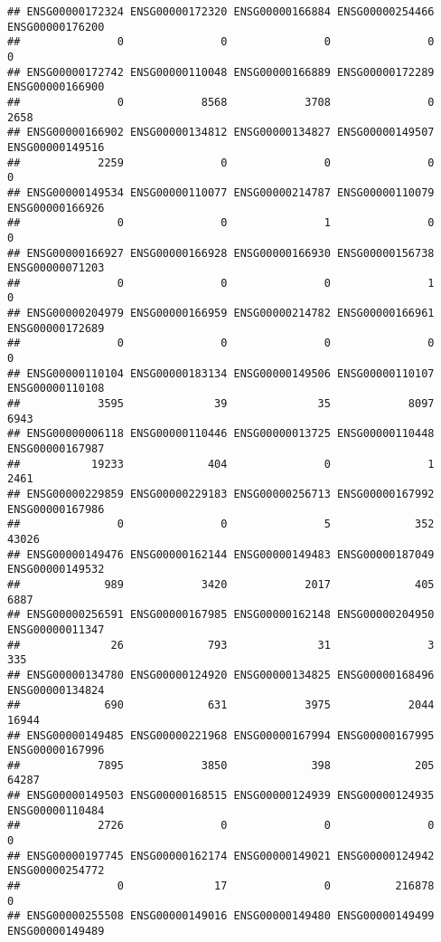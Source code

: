 \documentclass[
]{article}
\begin{document}
\begin{verbatim}
## ENSG00000172324 ENSG00000172320 ENSG00000166884 ENSG00000254466 ENSG00000176200 
##               0               0               0               0               0 
## ENSG00000172742 ENSG00000110048 ENSG00000166889 ENSG00000172289 ENSG00000166900 
##               0            8568            3708               0            2658 
## ENSG00000166902 ENSG00000134812 ENSG00000134827 ENSG00000149507 ENSG00000149516 
##            2259               0               0               0               0 
## ENSG00000149534 ENSG00000110077 ENSG00000214787 ENSG00000110079 ENSG00000166926 
##               0               0               1               0               0 
## ENSG00000166927 ENSG00000166928 ENSG00000166930 ENSG00000156738 ENSG00000071203 
##               0               0               0               1               0 
## ENSG00000204979 ENSG00000166959 ENSG00000214782 ENSG00000166961 ENSG00000172689 
##               0               0               0               0               0 
## ENSG00000110104 ENSG00000183134 ENSG00000149506 ENSG00000110107 ENSG00000110108 
##            3595              39              35            8097            6943 
## ENSG00000006118 ENSG00000110446 ENSG00000013725 ENSG00000110448 ENSG00000167987 
##           19233             404               0               1            2461 
## ENSG00000229859 ENSG00000229183 ENSG00000256713 ENSG00000167992 ENSG00000167986 
##               0               0               5             352           43026 
## ENSG00000149476 ENSG00000162144 ENSG00000149483 ENSG00000187049 ENSG00000149532 
##             989            3420            2017             405            6887 
## ENSG00000256591 ENSG00000167985 ENSG00000162148 ENSG00000204950 ENSG00000011347 
##              26             793              31               3             335 
## ENSG00000134780 ENSG00000124920 ENSG00000134825 ENSG00000168496 ENSG00000134824 
##             690             631            3975            2044           16944 
## ENSG00000149485 ENSG00000221968 ENSG00000167994 ENSG00000167995 ENSG00000167996 
##            7895            3850             398             205           64287 
## ENSG00000149503 ENSG00000168515 ENSG00000124939 ENSG00000124935 ENSG00000110484 
##            2726               0               0               0               0 
## ENSG00000197745 ENSG00000162174 ENSG00000149021 ENSG00000124942 ENSG00000254772 
##               0              17               0          216878               0 
## ENSG00000255508 ENSG00000149016 ENSG00000149480 ENSG00000149499 ENSG00000149489 

\end{verbatim}
\end{document}

